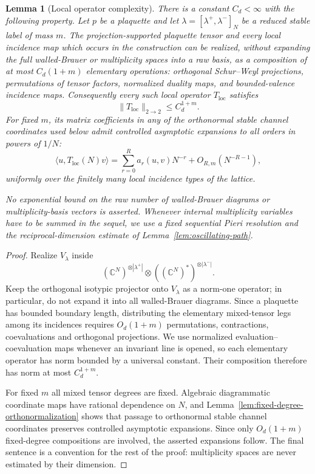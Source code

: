 \documentclass[11pt,a4paper,reqno]{amsart}
\newtheorem{lemma}[theorem]{Lemma}
\theoremstyle{definition}
\theoremstyle{remark}
\newcommand\C{{\mathbb C}}
\begin{document}
\begin{lemma}[Local operator complexity]\label{lem:local-operator-complexity}
There is a constant $C_d<\infty$ with the following property.  Let $p$ be a plaquette and let $\lambda=[\lambda^+,\lambda^-]_N$ be a reduced stable label of mass $m$.  The projection-supported plaquette tensor and every local incidence map which occurs in the construction can be realized, without expanding the full walled-Brauer or multiplicity spaces into a raw basis, as a composition of at most $C_d(1+m)$ elementary operations: orthogonal Schur--Weyl projections, permutations of tensor factors, normalized duality maps, and bounded-valence incidence maps.  Consequently every such local operator $T_{\mathrm{loc}}$ satisfies
\[
\|T_{\mathrm{loc}}\|_{2\to2}\le C_d^{1+m}.
\]
For fixed $m$, its matrix coefficients in any of the orthonormal stable channel coordinates used below admit controlled asymptotic expansions to all orders in powers of $1/N$:
\[
\langle u,T_{\mathrm{loc}}(N)v\rangle
= \sum_{r=0}^{R} a_r(u,v)N^{-r}+O_{R,m}(N^{-R-1}),
\]
uniformly over the finitely many local incidence types of the lattice.

No exponential bound on the \emph{raw number} of walled-Brauer diagrams or multiplicity-basis vectors is asserted.  Whenever internal multiplicity variables have to be summed in the sequel, we use a fixed sequential Pieri resolution and the reciprocal-dimension estimate of Lemma~\ref{lem:oscillating-path}.
\end{lemma}

\begin{proof}
Realize $V_\lambda$ inside
\[
(\C^N)^{\otimes|\lambda^+|}
\otimes
((\C^N)^*)^{\otimes|\lambda^-|}.
\]
Keep the orthogonal isotypic projector onto $V_\lambda$ as a norm-one operator; in particular, do not expand it into all walled-Brauer diagrams.  Since a plaquette has bounded boundary length, distributing the elementary mixed-tensor legs among its incidences requires $O_d(1+m)$ permutations, contractions, coevaluations and orthogonal projections.  We use normalized evaluation--coevaluation maps whenever an invariant line is opened, so each elementary operator has norm bounded by a universal constant.  Their composition therefore has norm at most $C_d^{1+m}$.

For fixed $m$ all mixed tensor degrees are fixed.  Algebraic diagrammatic coordinate maps have rational dependence on $N$, and Lemma~\ref{lem:fixed-degree-orthonormalization} shows that passage to orthonormal stable channel coordinates preserves controlled asymptotic expansions.  Since only $O_d(1+m)$ fixed-degree compositions are involved, the asserted expansions follow.  The final sentence is a convention for the rest of the proof: multiplicity spaces are never estimated by their dimension.
\end{proof}
\end{document}
